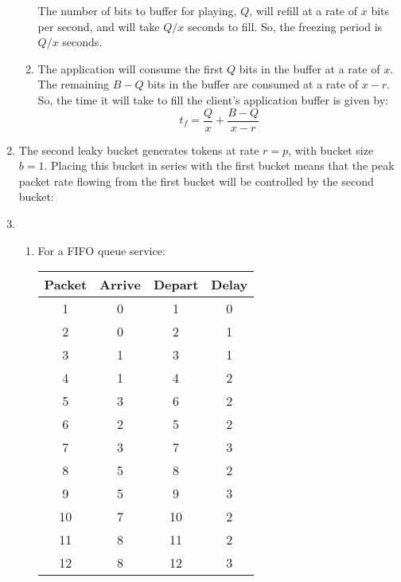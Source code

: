 \documentclass{article}
\begin{document}
\begin{enumerate}
\begin{enumerate}
The number of bits to buffer for playing, $Q$, will refill at a rate of $x$ bits per second, and will take $Q/x$ seconds to fill. So, the freezing period is $Q/x$ seconds.

\item The application will consume the first $Q$ bits in the buffer at a rate of $x$. The remaining $B-Q$ bits in the buffer are consumed at a rate of $x-r$. So, the time it will take to fill the client's application buffer is given by:
$$ t_f = \frac{Q}{x} + \frac{B-Q}{x-r} $$

\end{enumerate}

\item The second leaky bucket generates tokens at rate $ r = p $, with bucket size $ b = 1 $. Placing this bucket in series with the first bucket means that the peak packet rate flowing from the first bucket will be controlled by the second bucket:


\item
\begin{enumerate}
\item For a FIFO queue service:

\begin{tabular}{|c|c|c|c|}
    \hline
    Packet & Arrive & Depart & Delay \\
    \hline
    1 & 0 & 1 & 0 \\ \hline
    2 & 0 & 2 & 1 \\ \hline
    3 & 1 & 3 & 1 \\ \hline
    4 & 1 & 4 & 2 \\ \hline
    5 & 3 & 6 & 2 \\ \hline
    6 & 2 & 5 & 2 \\ \hline
    7 & 3 & 7 & 3 \\ \hline
    8 & 5 & 8 & 2 \\ \hline
    9 & 5 & 9 & 3 \\ \hline
    10 & 7 & 10 & 2 \\ \hline
    11 & 8 & 11 & 2 \\ \hline
    12 & 8 & 12 & 3 \\ \hline
\end{tabular}


\end{enumerate}
\end{enumerate}
\end{document}
